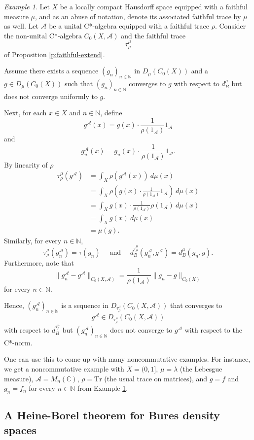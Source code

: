 \documentclass{amsart}
\theoremstyle{plain}
\theoremstyle{definition}
\theoremstyle{remark}
\newtheorem{example}[theorem]{Example}
\numberwithin{equation}{section}
\newcommand{\A}{{\mathcal{A}}}
\newcommand{\la}{{\lambda}}
\newcommand{\N}{{\mathds{N}}}
\newcommand{\C}{{\mathds{C}}}
\begin{document}
\begin{example}\label{e:noncomm-nonunital}
    Let $X$ be a locally compact Hausdorff space equipped with a faithful measure $\mu$, and as an abuse of notation, denote its associated faithful trace by $\mu$ as well. Let $\A$ be a unital C*-algebra equipped with a faithful trace $\rho$. Consider the non-unital C*-algebra $C_0(X,\A)$ and  the faithful trace
    \[
    \tau_\rho^\mu
    \]
    of Proposition \ref{p:faithful-extend}.

    Assume there exists a sequence $(g_n)_{n\in \N}$ in $D_\mu(C_0(X))$ and a $g\in D_\mu(C_0(X))$ such that $(g_n)_{n\in \N}$   converges to $g$ with respect to $d_B^\mu$ but does not converge uniformly to $g$.

     Next, for each $x\in X$ and $n\in \N$, define
\[ g^\A(x) = g(x)\cdot \frac{1}{\rho(1_\A)}1_\A 
\]
and 
\[ g_n^\A(x) =g_n(x)\cdot \frac{1}{\rho(1_\A)}1_\A .
\]  By linearity of $\rho$
\begin{align*}
\tau_\rho^\mu(g^\A)&=\int_{X} \rho(g^\A(x)) \ d\mu(x)\\
& = \int_{X} \rho\left(  g(x)\cdot \frac{1}{\rho(1_\A)}1_\A \right) \ d\mu(x)\\
& = \int_{X}  g(x)\cdot \frac{1}{\rho(1_\A)}\rho(1_\A)  \ d\mu(x)\\
& = \int_{X} g(x) \ d\mu(x)\\
& = \mu(g).
\end{align*}
Similarly, for every $n\in\N$,
\[
\tau_\rho^\mu(g_n^\A)=\tau(g_n) \quad \text{ and } \quad d_B^{\tau_\rho^\mu}(g^\A_n, g^\A)=d_B^\mu(g_n,g).
\]
Furthermore, note  that \[\|g^\A_n-g^\A\|_{C_0(X,\A)}=\frac{1}{\rho(1_\A)}\|g_n-g\|_{C_0(X)}\]
for every $n\in \N$.

Hence, $(g^\A_n)_{n\in \N}$ is a sequence in $D_{\tau_\rho^\mu}(C_0(X, \A))$ that converges to \[g^\A\in D_{\tau_\rho^\mu}(C_0(X, \A))\] with respect to $d_B^{\tau_\rho^\mu}$ but  $(g^\A_n)_{n\in \N}$ does not converge to $g^\A$ with respect to the C*-norm.

One can use this to come up with many noncommutative examples. For instance, we get a noncommutative example with $X=(0,1]$, $\mu=\la$ (the Lebesgue measure), $\A=M_n(\C)$, $\rho=\mathrm{Tr} $ (the usual trace on matrices), and $g=f$ and $g_n=f_n$ for every $n\in \N$ from Example \ref{e:noncomm-nonunital}.
\end{example}

\subsection{A Heine-Borel theorem for Bures density spaces}\label{s:hb}
\end{document}
